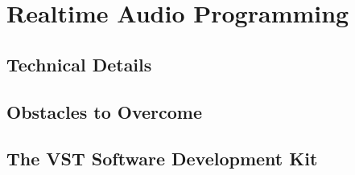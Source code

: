 \chapter{Realtime Audio Programming}
\section{Technical Details}
\section{Obstacles to Overcome}
\section{The VST Software Development Kit}

